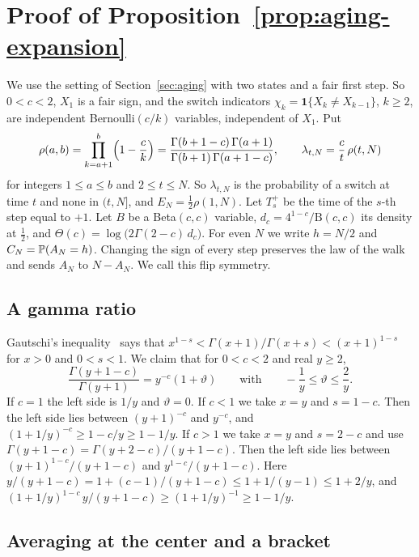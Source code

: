\section{Proof of Proposition~\ref{prop:aging-expansion}}\label{app:aging}

We use the setting of Section~\ref{sec:aging} with two states and a fair first
step. So $0<c<2$, $X_1$ is a fair sign, and the switch indicators
$\chi_k=\mathbf 1\{X_k\ne X_{k-1}\}$, $k\ge2$, are independent
Bernoulli$(c/k)$ variables, independent of $X_1$. Put
\[
\rho(a,b)=\prod_{k=a+1}^{b}\Bigl(1-\frac ck\Bigr)
=\frac{\Gamma(b+1-c)\,\Gamma(a+1)}{\Gamma(b+1)\,\Gamma(a+1-c)},\qquad
\lambda_{t,N}=\frac ct\,\rho(t,N)
\]
for integers $1\le a\le b$ and $2\le t\le N$. So $\lambda_{t,N}$ is the
probability of a switch at time $t$ and none in $(t,N]$, and
$E_N=\frac12\rho(1,N)$. Let $T^+_s$ be the time of the $s$-th step equal to
$+1$. Let $B$ be a Beta$(c,c)$ variable, $d_c=4^{1-c}/\mathrm B(c,c)$ its
density at $\frac12$, and $\Theta(c)=\log\bigl(2\Gamma(2-c)\,d_c\bigr)$. For
even $N$ we write $h=N/2$ and $C_N=\mathbb{P}(A_N=h)$. Changing the sign of every
step preserves the law of the walk and sends $A_N$ to $N-A_N$. We call this
flip symmetry.

\subsection{A gamma ratio}

Gautschi's inequality~\cite[5.6.4]{dlmf} says that
$x^{1-s}<\Gamma(x+1)/\Gamma(x+s)<(x+1)^{1-s}$ for $x>0$ and $0<s<1$. We
claim that for $0<c<2$ and real $y\ge2$,
\begin{equation}\label{eq:D-gamma}
\frac{\Gamma(y+1-c)}{\Gamma(y+1)}=y^{-c}(1+\vartheta)\qquad\text{with}\qquad
-\frac1y\le\vartheta\le\frac2y .
\end{equation}
If $c=1$ the left side is $1/y$ and $\vartheta=0$. If $c<1$ we take $x=y$ and
$s=1-c$. Then the left side lies between $(y+1)^{-c}$ and $y^{-c}$, and
$(1+1/y)^{-c}\ge1-c/y\ge1-1/y$. If $c>1$ we take $x=y$ and $s=2-c$ and use
$\Gamma(y+1-c)=\Gamma(y+2-c)/(y+1-c)$. Then the left side lies between
$(y+1)^{1-c}/(y+1-c)$ and $y^{1-c}/(y+1-c)$. Here
$y/(y+1-c)=1+(c-1)/(y+1-c)\le1+1/(y-1)\le1+2/y$, and
$(1+1/y)^{1-c}\,y/(y+1-c)\ge(1+1/y)^{-1}\ge1-1/y$.

\subsection{Averaging at the center and a bracket}

